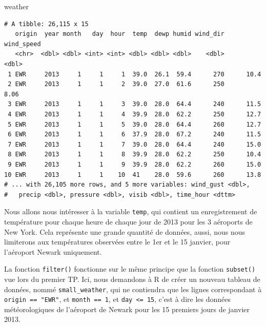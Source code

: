 \documentclass[a4paperpaper,]{article}
\newenvironment{Shaded}{\begin{snugshade}}{\end{snugshade}}
\newcommand{\KeywordTok}[1]{\textcolor[rgb]{0.13,0.29,0.53}{\textbf{#1}}}
\newcommand{\DecValTok}[1]{\textcolor[rgb]{0.00,0.00,0.81}{#1}}
\newcommand{\StringTok}[1]{\textcolor[rgb]{0.31,0.60,0.02}{#1}}
\newcommand{\OperatorTok}[1]{\textcolor[rgb]{0.81,0.36,0.00}{\textbf{#1}}}
\newcommand{\NormalTok}[1]{#1}
\theoremstyle{definition}
\theoremstyle{definition}
\theoremstyle{definition}
\theoremstyle{remark}
\begin{document}
\begin{Shaded}
\begin{Highlighting}[]
\NormalTok{weather}
\end{Highlighting}
\end{Shaded}

\begin{verbatim}
# A tibble: 26,115 x 15
   origin  year month   day  hour  temp  dewp humid wind_dir wind_speed
   <chr>  <dbl> <dbl> <int> <int> <dbl> <dbl> <dbl>    <dbl>      <dbl>
 1 EWR     2013     1     1     1  39.0  26.1  59.4      270      10.4 
 2 EWR     2013     1     1     2  39.0  27.0  61.6      250       8.06
 3 EWR     2013     1     1     3  39.0  28.0  64.4      240      11.5 
 4 EWR     2013     1     1     4  39.9  28.0  62.2      250      12.7 
 5 EWR     2013     1     1     5  39.0  28.0  64.4      260      12.7 
 6 EWR     2013     1     1     6  37.9  28.0  67.2      240      11.5 
 7 EWR     2013     1     1     7  39.0  28.0  64.4      240      15.0 
 8 EWR     2013     1     1     8  39.9  28.0  62.2      250      10.4 
 9 EWR     2013     1     1     9  39.9  28.0  62.2      260      15.0 
10 EWR     2013     1     1    10  41    28.0  59.6      260      13.8 
# ... with 26,105 more rows, and 5 more variables: wind_gust <dbl>,
#   precip <dbl>, pressure <dbl>, visib <dbl>, time_hour <dttm>
\end{verbatim}

Nous allons nous intéresser à la variable \texttt{temp}, qui contient un
enregistrement de température pour chaque heure de chaque jour de 2013
pour les 3 aéroports de New York. Cela représente une grande quantité de
données, aussi, nous nous limiterons aux températures observées entre le
1er et le 15 janvier, pour l'aéroport Newark uniquement.

\begin{Shaded}
\end{Shaded}

La fonction \texttt{filter()} fonctionne sur le même principe que la
fonction \texttt{subset()} vue lors du premier TP. Ici, nous demandons à
R de créer un nouveau tableau de données, nommé \texttt{small\_weather},
qui ne contiendra que les lignes correspondant à
\texttt{origin\ ==\ "EWR"}, et \texttt{month\ ==\ 1}, et
\texttt{day\ \textless{}=\ 15}, c'est à dire les données météorologiques
de l'aéroport de Newark pour les 15 premiers jours de janvier 2013.
\end{document}
